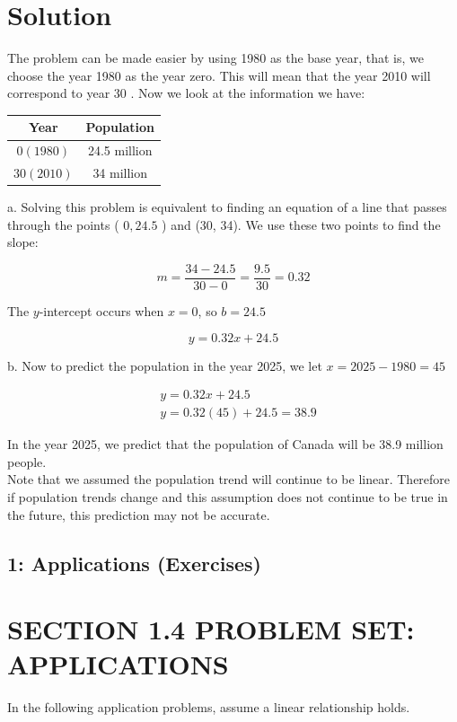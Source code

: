 \section*{Solution}
The problem can be made easier by using 1980 as the base year, that is, we choose the year 1980 as the year zero. This will mean that the year 2010 will correspond to year 30 . Now we look at the information we have:

\begin{center}
\begin{tabular}{|c|c|}
\hline
Year & Population \\
\hline
$0(1980)$ & 24.5 million \\
\hline
$30(2010)$ & 34 million \\
\hline
\end{tabular}
\end{center}

a. Solving this problem is equivalent to finding an equation of a line that passes through the points ( $0,24.5$ ) and (30, 34). We use these two points to find the slope:

$$
m=\frac{34-24.5}{30-0}=\frac{9.5}{30}=0.32
$$

The $y$-intercept occurs when $x=0$, so $b=24.5$

$$
y=0.32 x+24.5
$$

b. Now to predict the population in the year 2025, we let $x=2025-1980=45$

$$
\begin{aligned}
& y=0.32 x+24.5 \\
& y=0.32(45)+24.5=38.9
\end{aligned}
$$

In the year 2025, we predict that the population of Canada will be 38.9 million people.\\
Note that we assumed the population trend will continue to be linear. Therefore if population trends change and this assumption does not continue to be true in the future, this prediction may not be accurate.

\subsection*{1: Applications (Exercises)}
\section*{SECTION 1.4 PROBLEM SET: APPLICATIONS}
In the following application problems, assume a linear relationship holds.

